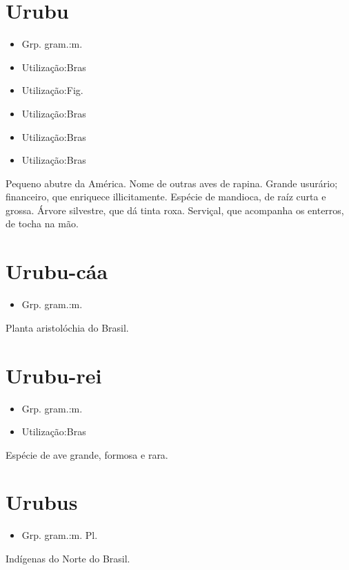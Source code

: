\documentclass{article}
\begin{document}
\section{Urubu}
\begin{itemize}
\item {Grp. gram.:m.}
\end{itemize}
\begin{itemize}
\item {Utilização:Bras}
\end{itemize}
\begin{itemize}
\item {Utilização:Fig.}
\end{itemize}
\begin{itemize}
\item {Utilização:Bras}
\end{itemize}
\begin{itemize}
\item {Utilização:Bras}
\end{itemize}
\begin{itemize}
\item {Utilização:Bras}
\end{itemize}
Pequeno abutre da América.
Nome de outras aves de rapina.
Grande usurário; financeiro, que enriquece illicitamente.
Espécie de mandioca, de raíz curta e grossa.
Árvore silvestre, que dá tinta roxa.
Serviçal, que acompanha os enterros, de tocha na mão.
\section{Urubu-cáa}
\begin{itemize}
\item {Grp. gram.:m.}
\end{itemize}
Planta aristolóchia do Brasil.
\section{Urubu-rei}
\begin{itemize}
\item {Grp. gram.:m.}
\end{itemize}
\begin{itemize}
\item {Utilização:Bras}
\end{itemize}
Espécie de ave grande, formosa e rara.
\section{Urubus}
\begin{itemize}
\item {Grp. gram.:m. Pl.}
\end{itemize}
Indígenas do Norte do Brasil.
\end{document}
